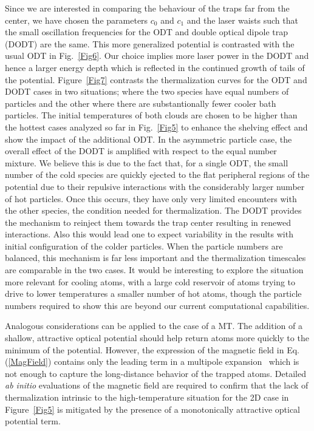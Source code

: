 \documentclass[pra,letterpaper,onecolumn,superscriptaddress,floatfix]{revtex4}
\begin{document}
Since we are interested in comparing the behaviour of the traps far from the center, we have 
chosen the parameters $c_0$ and $c_1$ and the laser waists such that the small oscillation frequencies 
for the ODT and double optical dipole trap (DODT) are the same. This more generalized potential is contrasted 
with the usual ODT in Fig.~\ref{Fig6}. Our choice implies more laser power in the DODT and  
hence a larger energy depth which is reflected in the continued growth of tails of the potential. 
Figure~\ref{Fig7} contrasts the thermalization curves for the ODT and DODT cases in two situations;
where the two species have equal numbers of particles and the other where there are substantionally fewer
cooler bath particles. The initial temperatures of both clouds are chosen to be higher 
than the hottest cases analyzed so far in Fig.~\ref{Fig5} to enhance the shelving effect and show 
the impact of the additional ODT.
In the asymmetric particle case, the overall effect of the DODT is amplified with respect to the equal number mixture.
We believe this is due to the fact that, for a single ODT, the small number of the cold species are quickly ejected to the
flat peripheral regions of the potential due to their repulsive interactions with the considerably larger number of hot particles.
Once this occurs, they have only very limited encounters with the other species, the condition needed for thermalization. 
The DODT provides the mechanism to reinject them towards the trap center resulting in renewed interactions. 
Also this would lead one to expect variability in the results with initial configuration of the colder particles. When the particle numbers
are balanced, this mechanism is far less important and the thermalization timescales are comparable in the two cases. 
It would be interesting to explore the situation more relevant for cooling atoms, with a large cold reservoir of atoms trying 
to drive to lower temperatures a smaller number of hot atoms, though the particle numbers required to show this are beyond our
current computational capabilities.

Analogous considerations can be applied to the case of a MT. The addition of a 
shallow, attractive optical potential should help return atoms more quickly to the minimum of the potential.
However, the expression of the magnetic field in Eq.(\ref{MagField}) contains only the leading term in a 
multipole expansion~\cite{Bergeman} which is not enough to capture the long-distance 
behavior of the trapped atoms. Detailed {\it ab initio} evaluations of the magnetic field are required to confirm 
that the lack of thermalization intrinsic to the high-temperature situation for the 2D case in Figure~\ref{Fig5} is
mitigated by the presence of a monotonically attractive optical potential term.
\end{document}

